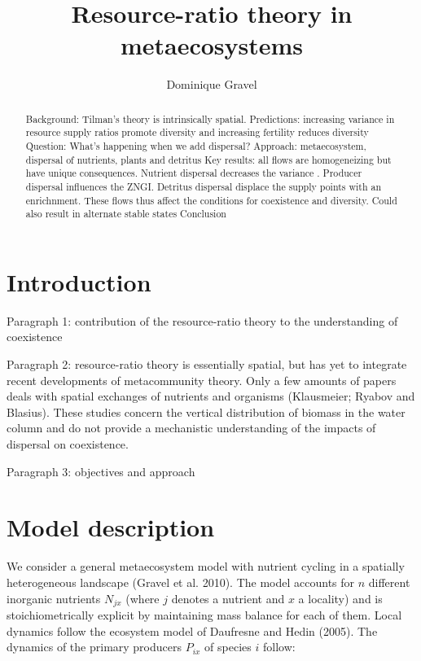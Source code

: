 \documentclass[12pt]{paper}
\title{Resource-ratio theory in metaecosystems}
\begin{document}

\author{Dominique Gravel}

\maketitle\onehalfspacing\linenumbers

\begin{abstract}
Background: Tilman's theory is intrinsically spatial. Predictions: increasing variance in resource supply ratios promote diversity and increasing fertility reduces diversity 
Question: What's happening when we add dispersal?
Approach: metaecosystem, dispersal of nutrients, plants and detritus
Key results: all flows are homogeneizing but have unique consequences. Nutrient dispersal decreases the variance . Producer dispersal influences the ZNGI. Detritus dispersal displace the supply points with an enrichnment. These flows thus affect the conditions for coexistence and diversity. Could also result in alternate stable states
Conclusion
\end{abstract}


\section{Introduction}


Paragraph 1: contribution of the resource-ratio theory to the understanding of coexistence

Paragraph 2: resource-ratio theory is essentially spatial, but has yet to integrate recent developments of metacommunity theory. Only a few amounts of papers deals with spatial exchanges of nutrients and organisms (Klausmeier; Ryabov and Blasius). These studies concern the vertical distribution of biomass in the water column and do not provide a mechanistic understanding of the impacts of dispersal on coexistence.

Paragraph 3: objectives and approach 


\section{Model description}
We consider a general metaecosystem model with nutrient cycling in a spatially heterogeneous landscape (Gravel et al. 2010). The model accounts for $n$ different inorganic nutrients $N_{jx}$ (where $j$ denotes a nutrient and $x$ a locality) and is stoichiometrically explicit by maintaining mass balance for each of them. Local dynamics follow the ecosystem model of Daufresne and Hedin (2005). The dynamics of the primary producers $P_{ix}$ of species $i$ follow:
\end{document}
